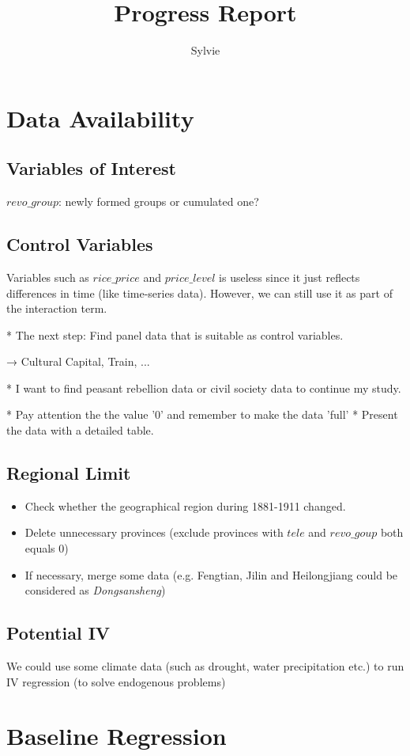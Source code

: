 \documentclass[english,10pt,a4paper]{article}
\title{Progress Report}
\author{Sylvie}
\begin{document}
	\maketitle
	\section{Data Availability}
	\subsection{Variables of Interest}
	$revo\_group$: newly formed groups or cumulated one?
	\subsection{Control Variables}
	Variables such as $rice\_price$ and $price\_level$ is useless since it just reflects differences in time (like time-series data). However, we can still use it as part of the interaction term.\par
	* The next step: Find panel data that is suitable as control variables.\par
	→ Cultural Capital, Train, ...\par
	* I want to find peasant rebellion data or civil society data to continue my study.\par
	* Pay attention the the value '0' and remember to make the data 'full'
	* Present the data with a detailed table.\par
	\subsection{Regional Limit}
	\begin{itemize}
		\item Check whether the geographical region during 1881-1911 changed.
		\item Delete unnecessary provinces (exclude provinces with $tele$ and $revo\_goup$ both equals 0)
		\item If necessary, merge some data (e.g. Fengtian, Jilin and Heilongjiang could be considered as \textit{Dongsansheng})
	\end{itemize}
	\subsection{Potential IV}
	We could use some climate data (such as drought, water precipitation etc.) to run IV regression (to solve endogenous problems)
	\section{Baseline Regression}
\end{document}
